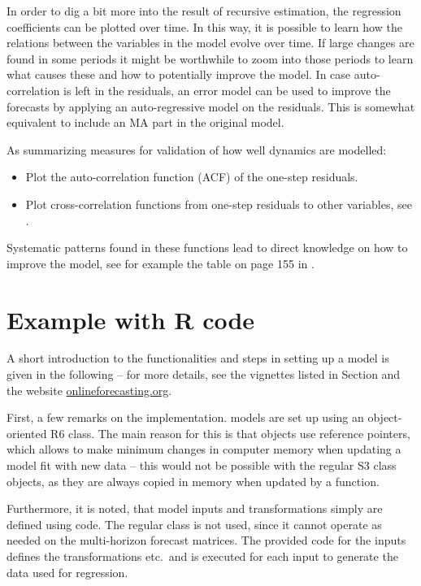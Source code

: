 In order to dig a bit more into the result of  recursive
estimation, the regression coefficients can be plotted over time. In this way,
it is possible to learn how the relations between the variables in the model
evolve over time. If large changes are found in some periods it might be
worthwhile to zoom into those periods to learn what causes these 
and how to potentially improve the model. In case auto-correlation is left in
the residuals, an error model can be used to improve the forecasts by applying
an auto-regressive model on the residuals. This is somewhat equivalent to
include an MA part in the original model.

As summarizing measures for validation of how well dynamics are modelled:
\begin{itemize}
\item Plot the auto-correlation function (ACF) of the one-step residuals.
\item Plot cross-correlation functions from one-step residuals to other
  variables, see \citep{bacher2013short}.
\end{itemize}
Systematic patterns found in these functions lead to direct knowledge on how to
improve the model, see for example the table on page 155 in
\cite{madsen2007time}.


\section{Example with R code} \label{sec:example-with-r-code}

A short introduction to the functionalities and steps in setting up a
model is given in the following -- for more details, see the
vignettes listed in Section  and the website \href{https://onlineforecasting.org}{onlineforecasting.org}.


First, a few remarks on the implementation. \onlineforecast models are set up
using an object-oriented R6 class. The main reason for this is that 
objects use reference pointers, which allows to make minimum changes in
computer memory when updating a model fit with new data -- this would not be
possible with the regular S3 class objects, as they are always copied in memory
when updated by a function.

Furthermore, it is noted, that model inputs and transformations simply are
defined using \Rprog code. The regular  class is not used, since
it cannot operate as needed on the multi-horizon forecast matrices. The provided
code for the inputs defines the transformations etc.\ and is executed for each
input to generate the data used for regression.


